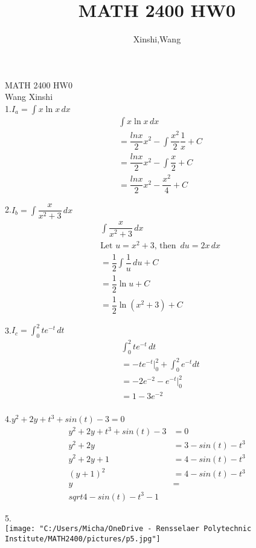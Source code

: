 \documentclass{article}
\title{MATH 2400 HW0}
\author{Xinshi,Wang}
\begin{document}
	\noindent
	MATH 2400 HW0 \\
	Wang Xinshi\\
	
	1.$I_a = \int x \ln x \,dx$
	\begin{align*}
		&\int x \ln x \,dx\\
		&=\dfrac{lnx}{2}x^2-\int\dfrac{x^2}{2}\dfrac{1}{x}+C\\
		&=\dfrac{lnx}{2}x^2-\int \dfrac{x}{2}+C\\
		&=\dfrac{lnx}{2}x^2-\dfrac{x^2}{4}+C
	\end{align*}

    2.$I_b = \int \dfrac{x}{x^2+3} \,dx$
    \begin{align*}
    	&\int \dfrac{x}{x^2+3} \,dx\\
    	&\text{Let $u = x^2+3$, then $\,du = 2x \,dx$}\\
    	&=\dfrac{1}{2} \int \dfrac{1}{u} \,du+C\\
    	&=\dfrac{1}{2} \ln u +C\\
    	&=\dfrac{1}{2} \ln(x^2+3)+C
    \end{align*}
	
	3.$I_c = \int_{0}^{2} te^{-t} \,dt$
	\begin{align*}
		&\int_{0}^{2} te^{-t} \,dt\\
		&=-te^{-t}\Big|_0^2+ \int_{0}^{2} e^{-t}dt\\
		&=-2e^{-2}-e^{-t} \Big|_0^2\\
		&=1-3e^{-2}\\
	\end{align*}

	4.$y^2+2y+t^3+sin(t)-3 = 0$
	\begin{align*}
		y^2+2y+t^3+sin(t)-3&= 0\\
		y^2+2y&=3-sin(t)-t^3\\
		y^2+2y+1&=4-sin(t)-t^3\\
		(y+1)^2&=4-sin(t)-t^3 \\
		y&=\\sqrt{4-sin(t)-t^3}-1
	\end{align*}
	\newpage

	5.\\
		\texttt{[image: "C:/Users/Micha/OneDrive - Rensselaer Polytechnic Institute/MATH2400/pictures/p5.jpg"]}
\end{document}
